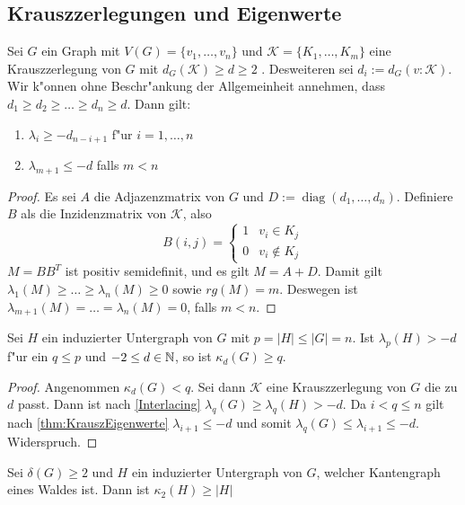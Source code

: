 \subsection{Krauszzerlegungen und Eigenwerte}
\begin{theorem}
    \label{thm:KrauszEigenwerte}
    Sei $G$ ein Graph mit $V(G)=\{v_1,\dots,v_n\}$ und $\mathcal K=\{K_1,\dots,K_m\}$ eine Krauszzerlegung von $G$ mit $d_G(\mathcal K) \geq d \geq 2$ . Desweiteren sei $d_i := d_G(v:\mathcal K)$. 
    Wir k"onnen ohne Beschr"ankung der Allgemeinheit annehmen, dass $d_1\geq d_2 \geq \dots \geq d_n \geq d$.
    Dann gilt: 
    \begin{enumerate}[label=(\alph*)]
        \item $\lambda_i \geq -d_{n-i+1}$ f"ur $i = 1, \dots , n$
        \item $\lambda_{m+1} \leq -d$ falls $m < n$
    \end{enumerate}
\end{theorem}
\begin{proof}
    Es sei $A$ die Adjazenzmatrix von $G$ und $D := \operatorname{diag}(d_1,\dots,d_n)$. Definiere $B$ als die Inzidenzmatrix von $\mathcal K$, also $$B(i,j) = \begin{cases}
        1 & v_i \in K_j \\ 0 & v_i \notin K_j
    \end{cases}$$ 
    $M=BB^{T}$ ist positiv semidefinit, und es gilt $M = A+D$. Damit gilt $\lambda_1(M) \geq \dots \geq \lambda_n(M) \geq 0$ sowie $rg(M) = m$. Deswegen ist $\lambda_{m+1}(M)=\dots=\lambda_n(M) = 0$, falls $m < n$. 
\end{proof}
\begin{corollary}
    \label{cor:Korollar1}
    Sei $H$ ein induzierter Untergraph von $G$ mit $p = \left| H\right| \leq \left|G\right| = n$.
    Ist $\lambda_p (H) > -d $ f"ur ein $q \leq p$ und $-2 \leq d \in {\mathbb{N}}$, so ist $\kappa_d(G) \geq q$.
\end{corollary}
\begin{proof}
    Angenommen $\kappa_d(G) < q$. Sei dann $\mathcal{K}$ eine Krauszzerlegung von $G$ die zu $d$ passt. Dann ist nach \ref{Interlacing} $\lambda_{q}(G)\geq \lambda_{q}(H) > -d$. 
    Da $i < q \leq n$ gilt nach \ref{thm:KrauszEigenwerte} $\lambda_{i+1}\leq -d$ und somit $\lambda_{q}(G)\leq \lambda_{i+1} \leq -d$. Widerspruch.
\end{proof}

\begin{corollary}
    Sei $\delta(G) \geq 2$ und $H$ ein induzierter Untergraph von $G$, welcher Kantengraph eines Waldes ist. 
    Dann ist $\kappa_{2}(H)\geq \left|H\right|$
\end{corollary}

